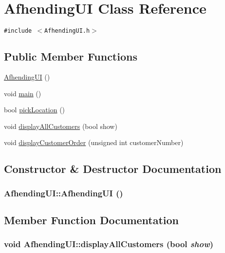 \hypertarget{class_afhending_u_i}{
\section{Afhending\-UI Class Reference}
\label{class_afhending_u_i}
}
{\tt \#include $<$Afhending\-UI.h$>$}

\subsection*{Public Member Functions}
\begin{CompactItemize}
\item 
\hyperlink{class_afhending_u_i_9ab844012d187620ec223d97b0b27720}{Afhending\-UI} ()
\item 
void \hyperlink{class_afhending_u_i_ea83b916b3f52eec32ae6d54d59b4453}{main} ()
\item 
bool \hyperlink{class_afhending_u_i_74d0d6b7d7493e8a9703bc8fbeb79f2e}{pick\-Location} ()
\item 
void \hyperlink{class_afhending_u_i_388ec3e6c0999970759fa9fdcacda10e}{display\-All\-Customers} (bool show)
\item 
void \hyperlink{class_afhending_u_i_537283a7f7677384872f66c6b1dc4491}{display\-Customer\-Order} (unsigned int customer\-Number)
\end{CompactItemize}


\subsection{Constructor \& Destructor Documentation}
\hypertarget{class_afhending_u_i_9ab844012d187620ec223d97b0b27720}{
\subsubsection[AfhendingUI]{\setlength{\rightskip}{0pt plus 5cm}Afhending\-UI::Afhending\-UI ()}}
\label{class_afhending_u_i_9ab844012d187620ec223d97b0b27720}




\subsection{Member Function Documentation}
\hypertarget{class_afhending_u_i_388ec3e6c0999970759fa9fdcacda10e}{
\subsubsection[displayAllCustomers]{\setlength{\rightskip}{0pt plus 5cm}void Afhending\-UI::display\-All\-Customers (bool {\em show})}}
\label{class_afhending_u_i_388ec3e6c0999970759fa9fdcacda10e}


